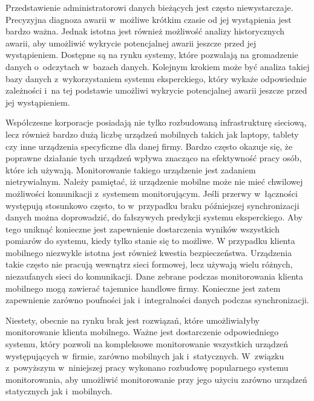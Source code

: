 Przedstawienie administratorowi danych bieżących jest często
niewystarczaje. Precyzyjna diagnoza awarii w~możliwe krótkim czasie od
jej wystąpienia jest bardzo ważna. Jednak istotna jest również
możliwość analizy historycznych awarii, aby umożliwić wykrycie
potencjalnej awarii jeszcze przed jej wystąpieniem. Dostępne są na
rynku systemy, które pozwalają na gromadzenie danych o~odczytach
w~bazach danych. Kolejnym krokiem może być analiza takiej bazy danych
z~wykorzystaniem systemu eksperckiego, który wykaże odpowiednie
zależności i~na tej podstawie umożliwi wykrycie potencjalnej awarii
jeszcze przed jej wystąpieniem.

Współczesne korporacje posiadają nie tylko rozbudowaną infrastrukturę
sieciową, lecz również bardzo dużą liczbę urządzeń mobilnych takich
jak laptopy, tablety czy inne urządzenia specyficzne dla danej
firmy. Bardzo często okazuje się, że poprawne działanie tych urządzeń
wpływa znacząco na efektywność pracy osób, które ich
używają. Monitorowanie takiego urządzenie jest zadaniem
nietrywialnym. Należy pamiętać, iż urządzenie mobilne może nie mieć
chwilowej możliwości komunikacji z~systemem monitorującym. Jeśli
przerwy w~łączności występują stosunkowo często, to w~przypadku braku
późniejszej synchronizacji danych można doprowadzić, do fałszywych
predykcji systemu eksperckiego. Aby tego uniknąć konieczne jest
zapewnienie dostarczenia wyników wszystkich pomiarów do systemu, kiedy
tylko stanie się to możliwe. W przypadku klienta mobilnego niezwykle
istotna jest również kwestia bezpieczeństwa. Urządzenia takie często
nie pracują wewnątrz sieci formowej, lecz używają wielu różnych,
niezaufanych sieci do komunikacji. Dane zebrane podczas monitorowania
klienta mobilnego mogą zawierać tajemnice handlowe firmy. Konieczne
jest zatem zapewnienie zarówno poufności jak i~integralności danych
podczas synchronizacji.

Niestety, obecnie na rynku brak jest rozwiązań, które umożliwiałyby
monitorowanie klienta mobilnego. Ważne jest dostarczenie odpowiedniego
systemu, który pozwoli na kompleksowe monitorowanie wszystkich
urządzeń występujących w~firmie, zarówno mobilnych jak
i~statycznych. W~związku z~powyższym w~niniejszej pracy wykonano
rozbudowę popularnego systemu monitorowania, aby umożliwić
monitorowanie przy jego użyciu zarówno urządzeń statycznych jak
i~mobilnych.

